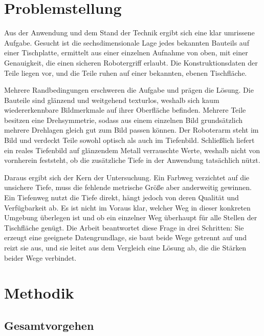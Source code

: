 \documentclass[oneside,studentpaper]{wbk}
\begin{document}
\chapter{Problemstellung}
\label{ch:problem}

Aus der Anwendung und dem Stand der Technik ergibt sich eine klar umrissene
Aufgabe. Gesucht ist die sechsdimensionale Lage jedes bekannten Bauteils auf
einer Tischplatte, ermittelt aus einer einzelnen Aufnahme von oben, mit einer
Genauigkeit, die einen sicheren Robotergriff erlaubt. Die Konstruktionsdaten der
Teile liegen vor, und die Teile ruhen auf einer bekannten, ebenen Tischfläche.

Mehrere Randbedingungen erschweren die Aufgabe und prägen die Lösung. Die
Bauteile sind glänzend und weitgehend texturlos, weshalb sich kaum
wiedererkennbare Bildmerkmale auf ihrer Oberfläche befinden. Mehrere Teile
besitzen eine Drehsymmetrie, sodass aus einem einzelnen Bild grundsätzlich
mehrere Drehlagen gleich gut zum Bild passen können. Der Roboterarm steht im Bild
und verdeckt Teile sowohl optisch als auch im Tiefenbild. Schließlich liefert ein
reales Tiefenbild auf glänzendem Metall verrauschte Werte, weshalb nicht von
vornherein feststeht, ob die zusätzliche Tiefe in der Anwendung tatsächlich
nützt.

Daraus ergibt sich der Kern der Untersuchung. Ein Farbweg verzichtet auf die
unsichere Tiefe, muss die fehlende metrische Größe aber anderweitig gewinnen. Ein
Tiefenweg nutzt die Tiefe direkt, hängt jedoch von deren Qualität und
Verfügbarkeit ab. Es ist nicht im Voraus klar, welcher Weg in dieser konkreten
Umgebung überlegen ist und ob ein einzelner Weg überhaupt für alle Stellen der
Tischfläche genügt. Die Arbeit beantwortet diese Frage in drei Schritten: Sie
erzeugt eine geeignete Datengrundlage, sie baut beide Wege getrennt auf und reizt
sie aus, und sie leitet aus dem Vergleich eine Lösung ab, die die Stärken beider
Wege verbindet.

\chapter{Methodik}
\label{ch:methodik}

\section{Gesamtvorgehen}
\end{document}
